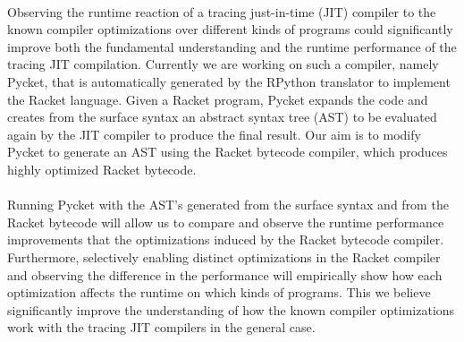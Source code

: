 \documentclass{article}
\begin{document}
\paragraph{} Observing the runtime reaction of a tracing just-in-time (JIT)
compiler to the known compiler optimizations over different kinds of
programs could significantly improve both the fundamental
understanding and the runtime performance of the tracing JIT
compilation. Currently we are working on such a compiler, namely
Pycket, that is automatically generated by the RPython translator to
implement the Racket language. Given a Racket program, Pycket expands
the code and creates from the surface syntax an abstract syntax tree
(AST) to be evaluated again by the JIT compiler to produce the final
result. Our aim is to modify Pycket to generate an AST using the
Racket bytecode compiler, which produces highly optimized Racket
bytecode.

\paragraph{} Running Pycket with the AST's generated from the surface syntax and from
the Racket bytecode will allow us to compare and observe the runtime
performance improvements that the optimizations induced by the Racket
bytecode compiler. Furthermore, selectively enabling distinct
optimizations in the Racket compiler and observing the
difference in the performance will empirically show how each
optimization affects the runtime on which kinds of programs. This we
believe significantly improve the understanding of how the known
compiler optimizations work with the tracing JIT compilers in the
general case.





\end{document}

